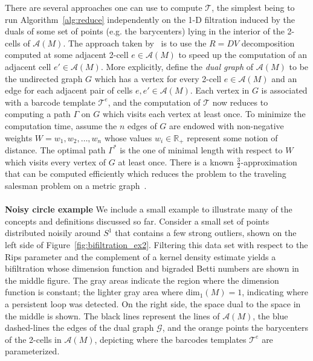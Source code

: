 \documentclass{article} %
\begin{document}
There are several approaches one can use to compute $\mathcal{T}$, the simplest being to run Algorithm~\ref{alg:reduce} independently on the 1-D filtration induced by the duals of some set of points (e.g. the barycenters) lying in the interior of the 2-cells of $\mathcal{A}(M)$.  
The approach taken by~\cite{lesnick2015interactive} is to use the $R = DV$ decomposition computed at some adjacent 2-cell $e \in \mathcal{A}(M)$ to speed up the computation of an adjacent cell $e' \in \mathcal{A}(M)$. More explicitly, define the \emph{dual graph} of $\mathcal{A}(M)$ to be the undirected graph $G$ which has a vertex for every 2-cell $e \in \mathcal{A}(M)$ and an edge for each adjacent pair of cells $e, e' \in \mathcal{A}(M)$.
Each vertex in $G$ is associated with a barcode template $\mathcal{T}^e$, and the computation of $\mathcal{T}$ now reduces to computing a path $\Gamma$ on $G$ which visits each vertex at least once. To minimize the computation time, assume the $n$ edges of $G$ are endowed with non-negative weights $W = w_1, w_2, \dots, w_n$ whose values $w_i \in \mathbb{R}_{+}$ represent some notion of distance. The optimal path $\Gamma^\ast$ is the one of minimal length with respect to $W$ which visits every vertex of $G$ at least once. There is a known $\frac{3}{2}$-approximation that can be computed efficiently which reduces the problem to the traveling salesman problem on a metric graph~\cite{christofides1976worst}.
\\
\\
\textbf{Noisy circle example} We include a small example to illustrate many of the concepts and definitions discussed so far. 
Consider a small set of points distributed noisily around $S^1$ that contains a few strong outliers, shown on the left side of Figure~\ref{fig:bifiltration_ex2}. Filtering this data set with respect to the Rips parameter and the complement of a kernel density estimate yields a bifiltration whose dimension function and bigraded Betti numbers are shown in the middle figure. The gray areas indicate the region where the dimension function is constant; the lighter gray area where $\mathrm{dim}_1(M) = 1$, indicating where a persistent loop was detected.
On the right side, the space dual to the space in the middle is shown. The black lines represent the lines of $\mathcal{A}(M)$, the blue dashed-lines the edges of the dual graph $\mathcal{G}$, and the orange points the barycenters of the 2-cells in $\mathcal{A}(M)$, depicting where the barcodes templates $\mathcal{T}^e$ are parameterized. 
\end{document}
